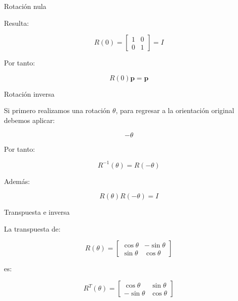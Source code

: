\documentclass[aspectratio=169]{beamer}
\begin{document}
\begin{frame}{Rotación nula}

    Resulta:

    \[
    \boxed{
        R(0)
        =
        \begin{bmatrix}
            1&0\\
            0&1
        \end{bmatrix}
        =
        I
    }
    \]

    Por tanto:

    \[
    R(0)\mathbf{p}=\mathbf{p}
    \]

    \vspace{0.3cm}


\end{frame}

\begin{frame}{Rotación inversa}

    Si primero realizamos una rotación $\theta$, para regresar a la
    orientación original debemos aplicar:

    \[
    -\theta
    \]

    Por tanto:

    \[
    R^{-1}(\theta)=R(-\theta)
    \]

    Además:

    \[
    R(\theta)R(-\theta)=I
    \]

    \vspace{0.3cm}


\end{frame}

\begin{frame}{Transpuesta e inversa}

    La transpuesta de:

    \[
    R(\theta)
    =
    \begin{bmatrix}
        \cos\theta & -\sin\theta\\
        \sin\theta & \cos\theta
    \end{bmatrix}
    \]

    es:

    \[
    R^T(\theta)
    =
    \begin{bmatrix}
        \cos\theta & \sin\theta\\
        -\sin\theta & \cos\theta
    \end{bmatrix}
    \]

\end{frame}
\end{document}
